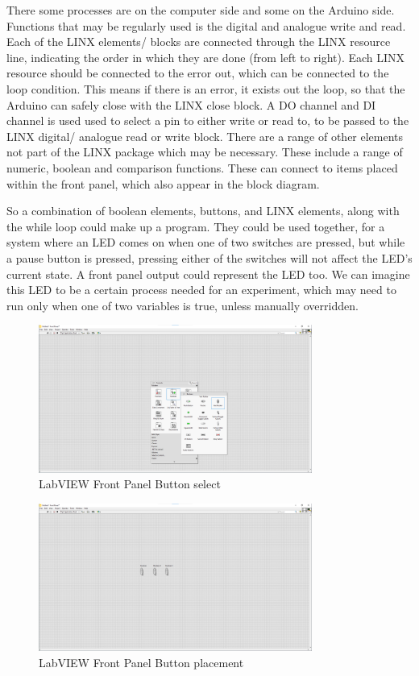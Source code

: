 \documentclass[a4paper,11pt]{report}
\begin{document}
There some processes are on the computer side and some on the Arduino side. Functions that may be regularly used is the digital and analogue write and read. Each of the LINX elements/ blocks are connected through the LINX resource line, indicating the order in which they are done (from left to right). Each LINX resource should be connected to the error out, which can be connected to the loop condition. This means if there is an error, it exists out the loop, so that the Arduino can safely close with the LINX close block. A DO channel and DI channel is used used to select a pin to either write or read to, to be passed to the LINX digital/ analogue read or write block. There are a range of other elements not part of the LINX package which may be necessary. These include a range of numeric, boolean and comparison functions. These can connect to items placed within the front panel, which also appear in the block diagram.

So a combination of boolean elements, buttons, and LINX elements, along with the while loop could make up a program. They could be used together, for a system where an LED comes on when one of two switches are pressed, but while a pause button is pressed, pressing either of the switches will not affect the LED's current state. A front panel output could represent the LED too. We can imagine this LED to be a certain process needed for an experiment, which may need to run only when one of two variables is true, unless manually overridden.

\begin{figure}[H]
\centering
\includegraphics[width=0.8\textwidth]{screenshots/labview10}
\caption{LabVIEW Front Panel Button select}
\end{figure}

\begin{figure}[H]
\centering
\includegraphics[width=0.8\textwidth]{screenshots/labview11}
\caption{LabVIEW Front Panel Button placement}
\end{figure}
\end{document}
